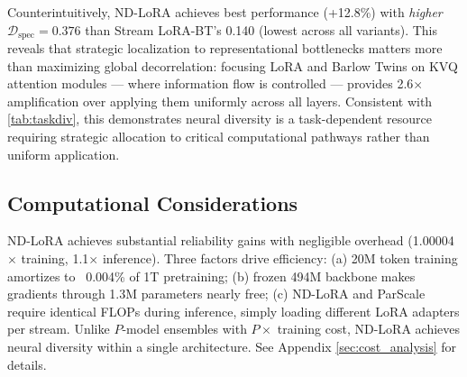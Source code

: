 \documentclass{article} %
\begin{document}
Counterintuitively, ND-LoRA achieves best performance (+12.8\%) with \emph{higher} $\mathcal{D}_{\text{spec}}
= 0.376$ than Stream LoRA-BT's 0.140 (lowest across all variants). This reveals that strategic localization
to representational bottlenecks matters more than maximizing global decorrelation: focusing LoRA and Barlow
Twins on KVQ attention modules --- where information flow is controlled --- provides 2.6$\times$ amplification
over applying them uniformly across all layers. Consistent with \autoref{tab:taskdiv}, this demonstrates
neural diversity is a task-dependent resource requiring strategic allocation to critical computational
pathways rather than uniform application.

\subsection{Computational Considerations}
ND-LoRA achieves substantial reliability gains with negligible overhead (1.00004$\times$ training,
1.1$\times$ inference). Three factors drive efficiency: (a) 20M token training amortizes to ~0.004\% of 1T
pretraining; (b) frozen 494M backbone makes gradients through 1.3M parameters nearly free; (c) ND-LoRA and
ParScale require identical FLOPs during inference, simply loading different LoRA adapters per stream. Unlike $P$-model
ensembles with $P\times$ training cost, ND-LoRA achieves neural diversity within a single architecture.
See Appendix \ref{sec:cost_analysis} for details.
\end{document}
